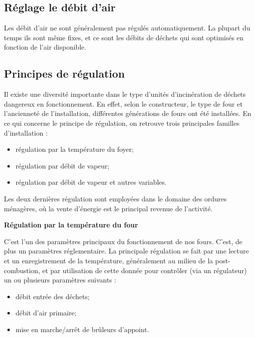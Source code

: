 \subsection{Réglage le débit d'air}


Les débit d’air ne sont généralement pas régulés automatiquement. La plupart du temps ils sont même fixes, et ce sont les débits de déchets qui sont optimisés en fonction de l’air disponible.


\subsection{Principes de régulation}

Il existe une diversité importante dans le type d’unités d’incinération de déchets dangereux en fonctionnement. En effet, selon le constructeur, le type de four et l’ancienneté de l’installation, différentes générations de fours ont été installées.
En ce qui concerne le principe de régulation, on retrouve trois principales familles d’installation :

\begin{itemize}
\item régulation par la température du foyer;
\item régulation par débit de vapeur;
\item régulation par débit de vapeur et autres variables.
\end{itemize}

\vspace{0.3cm}
Les deux dernières régulation sont employées dans le domaine des ordures ménagères, où la vente d’énergie est le principal revenue de l’activité.


\vspace{0.3cm}
\textbf{Régulation par la température du four}
\vspace{0.3cm}

C’est l’un des paramètres principaux du fonctionnement de nos fours. C’est, de plus un paramètres réglementaire.
La principale régulation se fait par une lecture et un enregistrement de la température, généralement au milieu de la post-combustion, et par utilisation de cette donnée pour contrôler (via un régulateur) un ou plusieurs paramètres suivants :

\begin{itemize}
\item débit entrée des déchets;
\item débit d’air primaire;
\item mise en marche/arrêt de brûleurs d’appoint.

\end{itemize} 

